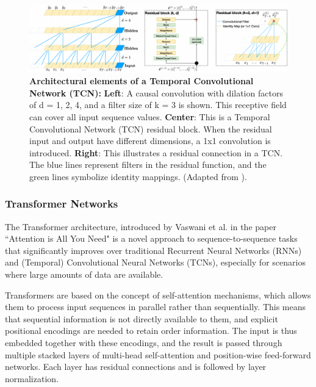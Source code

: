 \begin{figure}[!thb]
\centering
\includegraphics[width=\textwidth]{Figures/sota_6.pdf}

\caption[\textbf{Architectural elements of a Temporal Convolutional Network (TCN)}]{\textbf{Architectural elements of a Temporal Convolutional Network (TCN):} \textbf{Left}: A causal convolution with dilation factors of d = 1, 2, 4, and a filter size of k = 3 is shown. This receptive field can cover all input sequence values. \textbf{Center}: This is a Temporal Convolutional Network (TCN) residual block. When the residual input and output have different dimensions, a 1x1 convolution is introduced. \textbf{Right}: This illustrates a residual connection in a TCN. The blue lines represent filters in the residual function, and the green lines symbolize identity mappings. (Adapted from \cite{Bai2018AnModeling}).}
\label{fig:2.6}

\end{figure}

\subsubsection{Transformer Networks}

The Transformer architecture, introduced by Vaswani et al. in the paper ``Attention is All You Need" \cite{Vaswani2017AttentionNeed} is a novel approach to sequence-to-sequence tasks that significantly improves over traditional Recurrent Neural Networks (RNNs) and (Temporal) Convolutional Neural Networks (TCNs), especially for scenarios where large amounts of data are available.

Transformers are based on the concept of self-attention mechanisms, which allows them to process input sequences in parallel rather than sequentially. This means that sequential information is not directly available to them, and explicit positional encodings are needed to retain order information. The input is thus embedded together with these encodings, and the result is passed through multiple stacked layers of multi-head self-attention and position-wise feed-forward networks. Each layer has residual connections and is followed by layer normalization.

